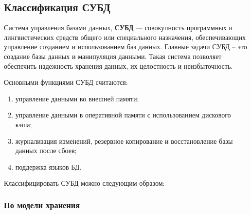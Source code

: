\subsection{Классификация СУБД}

Система управления базами данных, \textbf{СУБД} — совокупность программных и лингвистических средств общего или специального назначения, обеспечивающих управление созданием и использованием баз данных. Главные задачи СУБД – это создание базы данных и манипуляция данными. Такая система позволяет обеспечить надежность хранения данных, их целостность и неизбыточность.

Основными функциями СУБД считаются:
\begin{enumerate}[label=\arabic*.]
	\item управление данными во внешней памяти;
    \item управление данными в оперативной памяти с использованием дискового кэша;
	\item журнализация изменений, резервное копирование и восстановление базы данных после сбоев;
	\item поддержка языков БД.
\end{enumerate}

Классифицировать СУБД можно следующим образом:

\subsubsection{По модели хранения}

